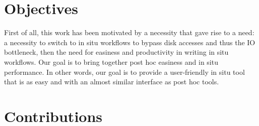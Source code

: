 
\section{Objectives}
First of all, this work has been motivated by a necessity that gave rise to a need: a necessity to switch to in situ workflows to bypass disk accesses and thus the IO bottleneck, then the need for easiness and productivity in writing in situ workflows. Our goal is to bring together post hoc easiness and in situ performance. In other words, our goal is to provide a user-friendly in situ tool that is as easy and with an almost similar interface as post hoc tools.  


\section{Contributions}

